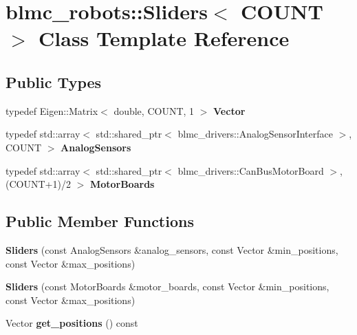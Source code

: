 \hypertarget{classblmc__robots_1_1Sliders}{}\section{blmc\+\_\+robots\+:\+:Sliders$<$ C\+O\+U\+NT $>$ Class Template Reference}
\label{classblmc__robots_1_1Sliders}
\subsection*{Public Types}
\begin{DoxyCompactItemize}
\item 
typedef Eigen\+::\+Matrix$<$ double, C\+O\+U\+NT, 1 $>$ {\bfseries Vector}\hypertarget{classblmc__robots_1_1Sliders_a40f558e5970d0a1f5817dbd18d162733}{}\label{classblmc__robots_1_1Sliders_a40f558e5970d0a1f5817dbd18d162733}

\item 
typedef std\+::array$<$ std\+::shared\+\_\+ptr$<$ blmc\+\_\+drivers\+::\+Analog\+Sensor\+Interface $>$, C\+O\+U\+NT $>$ {\bfseries Analog\+Sensors}\hypertarget{classblmc__robots_1_1Sliders_aa529cb0d46f753f32db90900d36fd288}{}\label{classblmc__robots_1_1Sliders_aa529cb0d46f753f32db90900d36fd288}

\item 
typedef std\+::array$<$ std\+::shared\+\_\+ptr$<$ blmc\+\_\+drivers\+::\+Can\+Bus\+Motor\+Board $>$,(C\+O\+U\+NT+1)/2 $>$ {\bfseries Motor\+Boards}\hypertarget{classblmc__robots_1_1Sliders_a3fad333ad5425ebde8b82b2f0956f4bd}{}\label{classblmc__robots_1_1Sliders_a3fad333ad5425ebde8b82b2f0956f4bd}

\end{DoxyCompactItemize}
\subsection*{Public Member Functions}
\begin{DoxyCompactItemize}
\item 
{\bfseries Sliders} (const Analog\+Sensors \&analog\+\_\+sensors, const Vector \&min\+\_\+positions, const Vector \&max\+\_\+positions)\hypertarget{classblmc__robots_1_1Sliders_ae957034a00de8edc19320a608e4cf997}{}\label{classblmc__robots_1_1Sliders_ae957034a00de8edc19320a608e4cf997}

\item 
{\bfseries Sliders} (const Motor\+Boards \&motor\+\_\+boards, const Vector \&min\+\_\+positions, const Vector \&max\+\_\+positions)\hypertarget{classblmc__robots_1_1Sliders_aeb72e8d249a9d1b419e47a1327602672}{}\label{classblmc__robots_1_1Sliders_aeb72e8d249a9d1b419e47a1327602672}

\item 
Vector {\bfseries get\+\_\+positions} () const \hypertarget{classblmc__robots_1_1Sliders_ab4b389a2026c9ea94c32f7a2a35ddbc6}{}\label{classblmc__robots_1_1Sliders_ab4b389a2026c9ea94c32f7a2a35ddbc6}

\end{DoxyCompactItemize}
